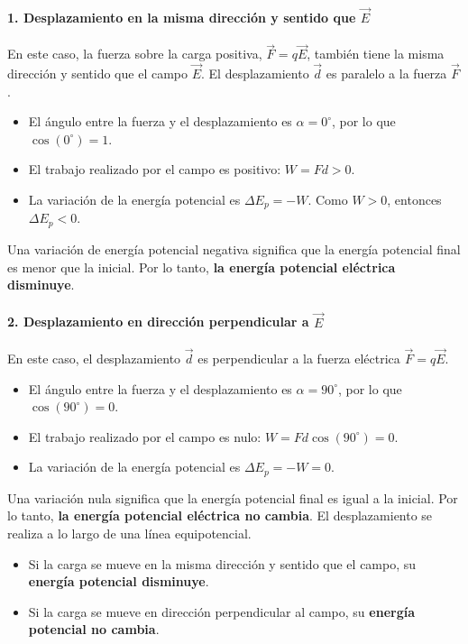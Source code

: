 \paragraph*{1. Desplazamiento en la misma dirección y sentido que $\vec{E}$}
En este caso, la fuerza sobre la carga positiva, $\vec{F}=q\vec{E}$, también tiene la misma dirección y sentido que el campo $\vec{E}$. El desplazamiento $\vec{d}$ es paralelo a la fuerza $\vec{F}$.
\begin{itemize}
    \item El ángulo entre la fuerza y el desplazamiento es $\alpha=0^\circ$, por lo que $\cos(0^\circ)=1$.
    \item El trabajo realizado por el campo es positivo: $W = Fd > 0$.
    \item La variación de la energía potencial es $\Delta E_p = -W$. Como $W>0$, entonces $\Delta E_p < 0$.
\end{itemize}
Una variación de energía potencial negativa significa que la energía potencial final es menor que la inicial. Por lo tanto, \textbf{la energía potencial eléctrica disminuye}.

\paragraph*{2. Desplazamiento en dirección perpendicular a $\vec{E}$}
En este caso, el desplazamiento $\vec{d}$ es perpendicular a la fuerza eléctrica $\vec{F}=q\vec{E}$.
\begin{itemize}
    \item El ángulo entre la fuerza y el desplazamiento es $\alpha=90^\circ$, por lo que $\cos(90^\circ)=0$.
    \item El trabajo realizado por el campo es nulo: $W = Fd\cos(90^\circ) = 0$.
    \item La variación de la energía potencial es $\Delta E_p = -W = 0$.
\end{itemize}
Una variación nula significa que la energía potencial final es igual a la inicial. Por lo tanto, \textbf{la energía potencial eléctrica no cambia}. El desplazamiento se realiza a lo largo de una línea equipotencial.

\begin{cajaresultado}
\begin{itemize}
    \item Si la carga se mueve en la misma dirección y sentido que el campo, su \textbf{energía potencial disminuye}.
    \item Si la carga se mueve en dirección perpendicular al campo, su \textbf{energía potencial no cambia}.
\end{itemize}
\end{cajaresultado}

